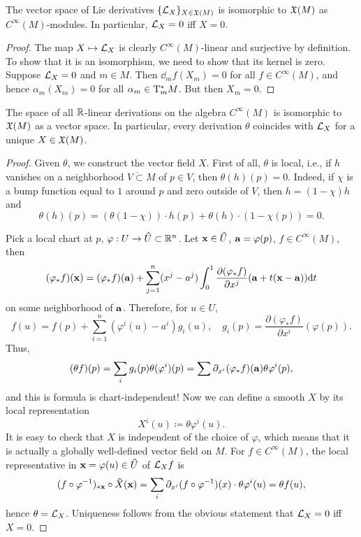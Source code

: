 \begin{prop}\label{prop 2.2.9 Marsden}
    The vector space of Lie derivatives $\{\Lie_X\}_{X\in\fX(M)}$ is isomorphic to $\fX(M)$ as $C^\infty(M)$-modules. In particular, $\Lie_X=0$ iff $X=0$.
\end{prop}
\begin{proof}
    The map $X\mapsto \calL_X$ is clearly $C^\infty(M)$-linear and surjective by definition. To show that it is an isomorphism, we need to show that its kernel is zero. Suppose $\calL_X=0$ and $m\in M$. Then $\dd_m f(X_m)=0$ for all $f\in C^\infty(M)$, and hence $\alpha_m(X_m)=0$ for all $\alpha_m\in \T_m^\ast M$. But then $X_m=0$.
\end{proof}
\begin{prop}\label{lie derivatives and vector fields}
The space of all $\bbR $-linear derivations on the algebra $C^\infty(M)$ is isomorphic to $\fX(M)$ as a vector space. In particular, every derivation $\theta$ coincides with $\Lie_X$ for a unique $X\in\fX(M)$.
\end{prop}
\begin{proof}
    Given $\theta$, we construct the vector field $X$.
    First of all, $\theta$ is local, i.e., if $h$ vanishes on a neighborhood $V\mathring{\subset} M$ of $p\in V$, then $\theta(h)(p)=0$. Indeed, if $\chi$ is a bump function equal to $1$ around $p$ and zero outside of $V$, then $h=(1-\chi)h$ and
    \[\theta(h)(p)=(\theta(1-\chi))\cdot h(p)+\theta(h)\cdot (1-\chi(p))=0.\]

    Pick a local chart at $p$, $\varphi:U\to\wh{U}\subset\bbR^n$. Let $\bf{x}\in\wh{U}$, $\bf{a}=\varphi(p)$, $f\in C^\infty(M)$, then 
    \[(\varphi_\ast f)(\bf{x})=(\varphi_\ast f)(\bf{a})+\sum_{j=1}^n (x^j-a^j)\int_0^1 \frac{\partial(\varphi_\ast f)}{\partial x^j} (\bf{a}+t(\bf{x}-\bf{a}))\dd t\]
    on some neighborhood of $\bf{a}$.
    Therefore, for $u\in U$,
    \[f(u)=f(p)+\sum_{i=1}^n (\varphi^i(u)-a^i)g_i(u),\quad g_i(p)=\frac{\partial(\varphi_\ast f)}{\partial x^i} (\varphi(p)).\] 
    Thus,
    \[(\theta f)(p)=\sum_i g_i(p)\theta(\varphi^i)(p)=\sum \partial_{x^i}(\varphi_\ast f)(\bf{a}) \theta \varphi^i(p),\]
    and this is formula is chart-independent! Now we can define a smooth $X$ by its local representation
    \[X^i(u)\coloneqq \theta\varphi^i(u).\]
    It is easy to check that $X$ is independent of the choice of $\varphi$, which means that it is actually a globally well-defined vector field on $M$. For $f\in C^\infty(M)$, the local representative in $\bf{x}=\varphi(u)\in\wh{U}$ of $\Lie_X f$ is 
    \[(f\circ\varphi^{-1})_{\ast \bf{x}}\circ \wh{X}(\bf{x})=\sum_i \partial_{x^i}(f\circ \varphi^{-1})(x)\cdot \theta \varphi^i (u)=\theta f(u),\]
    hence $\theta=\Lie_X$.
    Uniqueness follows from the obvious statement that $\Lie_X=0$ iff $X=0$.
\end{proof}
